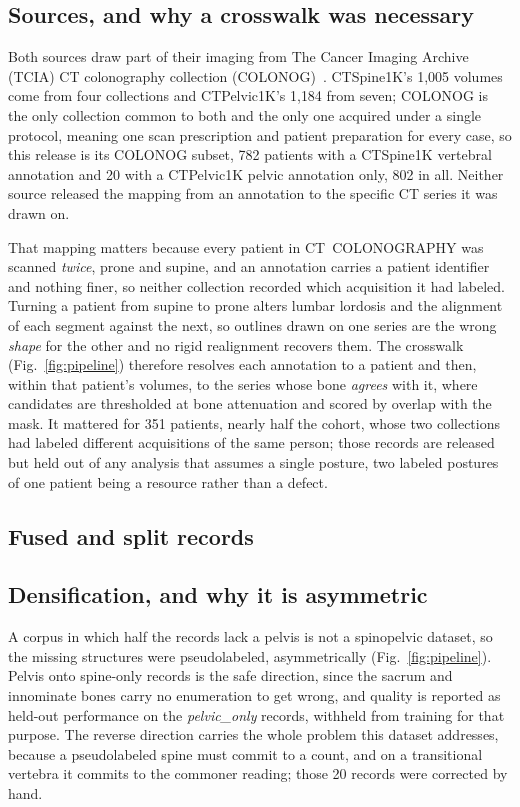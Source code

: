 \documentclass[aapm,mph,amsmath,amssymb,reprint]{revtex4-2}
\begin{document}
\subsection{Sources, and why a crosswalk was necessary}\label{sec:sources}

Both sources draw part of their imaging from The Cancer Imaging Archive (TCIA) CT
colonography collection (COLONOG)~\cite{colonog,tcia}. CTSpine1K's 1{,}005 volumes come from four
collections and CTPelvic1K's 1{,}184 from seven; COLONOG is the only collection common to
both and the only one acquired under a single protocol, meaning one scan prescription and
patient preparation for every case, so this release is its COLONOG subset, 782 patients with a CTSpine1K vertebral annotation and 20 with a CTPelvic1K pelvic
annotation only, 802 in all. Neither source released the mapping from an annotation to the
specific CT series it was drawn on.

That mapping matters because every patient in CT~COLONOGRAPHY was scanned \emph{twice},
prone and supine, and an annotation carries a patient identifier and nothing finer, so
neither collection recorded which acquisition it had labeled. Turning a patient from supine
to prone alters lumbar lordosis and the alignment of each segment against the next, so
outlines drawn on one series are the wrong \emph{shape} for the other and no rigid
realignment recovers them. The crosswalk (Fig.~\ref{fig:pipeline}) therefore resolves each
annotation to a patient and then, within that patient's volumes, to the series whose bone
\emph{agrees} with it, where candidates are thresholded at bone attenuation and scored by
overlap with the mask. It mattered for 351 patients, nearly half the cohort, whose two
collections had labeled different acquisitions of the same person; those records are
released but held out of any analysis that assumes a single posture, two labeled postures of
one patient being a resource rather than a defect.

\subsection{Fused and split records}

 

\subsection{Densification, and why it is asymmetric}

A corpus in which half the records lack a pelvis is not a spinopelvic dataset, so the
missing structures were pseudolabeled, asymmetrically (Fig.~\ref{fig:pipeline}). Pelvis onto spine-only records is the safe direction, since the sacrum and innominate bones
carry no enumeration to get wrong, and quality is reported as held-out performance on the
\emph{pelvic\_only} records, withheld from training for that purpose. The reverse direction
carries the whole problem this dataset addresses, because a pseudolabeled spine must commit
to a count, and on a transitional vertebra it commits to the commoner reading; those 20
records were corrected by hand.
\end{document}

